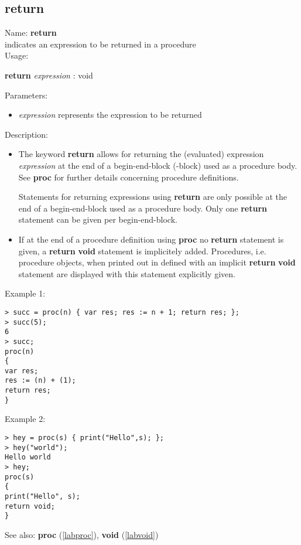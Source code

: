 \subsection{return}
\label{labreturn}
\noindent Name: \textbf{return}\\
\phantom{aaa}indicates an expression to be returned in a procedure\\[0.2cm]
\noindent Usage: 
\begin{center}
\textbf{return} \emph{expression} : \textsf{void}\\
\end{center}
Parameters: 
\begin{itemize}
\item \emph{expression} represents the expression to be returned
\end{itemize}
\noindent Description: \begin{itemize}

\item The keyword \textbf{return} allows for returning the (evaluated) expression
   \emph{expression} at the end of a begin-end-block ({}-block) used as a
   \sollya procedure body. See \textbf{proc} for further details concerning
   \sollya procedure definitions.
     
   Statements for returning expressions using \textbf{return} are only possible
    at the end of a begin-end-block used as a \sollya procedure
    body. Only one \textbf{return} statement can be given per begin-end-block.

\item If at the end of a procedure definition using \textbf{proc} no \textbf{return}
   statement is given, a \textbf{return} \textbf{void} statement is implicitely
   added. Procedures, i.e. procedure objects, when printed out in \sollya
   defined with an implicit \textbf{return} \textbf{void} statement are displayed with
   this statement explicitly given.
\end{itemize}
\noindent Example 1: 
\begin{center}\begin{minipage}{15cm}\begin{Verbatim}[frame=single]
> succ = proc(n) { var res; res := n + 1; return res; };
> succ(5);
6
> succ;
proc(n)
{
var res;
res := (n) + (1);
return res;
}
\end{Verbatim}
\end{minipage}\end{center}
\noindent Example 2: 
\begin{center}\begin{minipage}{15cm}\begin{Verbatim}[frame=single]
> hey = proc(s) { print("Hello",s); };
> hey("world");
Hello world
> hey;
proc(s)
{
print("Hello", s);
return void;
}
\end{Verbatim}
\end{minipage}\end{center}
See also: \textbf{proc} (\ref{labproc}), \textbf{void} (\ref{labvoid})
